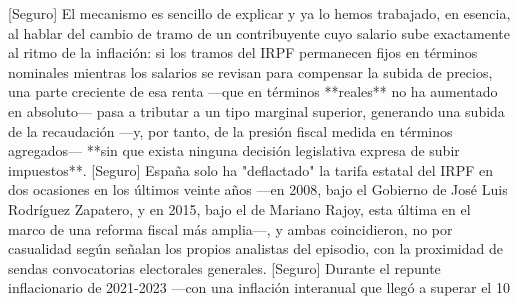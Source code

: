 \documentclass[10pt,a4paper]{article}
\begin{document}
[Seguro] El mecanismo es sencillo de explicar y ya lo hemos trabajado, en esencia, al hablar del cambio de tramo de un contribuyente cuyo salario sube exactamente al ritmo de la inflación: si los tramos del IRPF permanecen fijos en términos nominales mientras los salarios se revisan para compensar la subida de precios, una parte creciente de esa renta —que en términos **reales** no ha aumentado en absoluto— pasa a tributar a un tipo marginal superior, generando una subida de la recaudación —y, por tanto, de la presión fiscal medida en términos agregados— **sin que exista ninguna decisión legislativa expresa de subir impuestos**. [Seguro] España solo ha "deflactado" la tarifa estatal del IRPF en dos ocasiones en los últimos veinte años —en 2008, bajo el Gobierno de José Luis Rodríguez Zapatero, y en 2015, bajo el de Mariano Rajoy, esta última en el marco de una reforma fiscal más amplia—, y ambas coincidieron, no por casualidad según señalan los propios analistas del episodio, con la proximidad de sendas convocatorias electorales generales. [Seguro] Durante el repunte inflacionario de 2021-2023 —con una inflación interanual que llegó a superar el 10%
\end{document}
